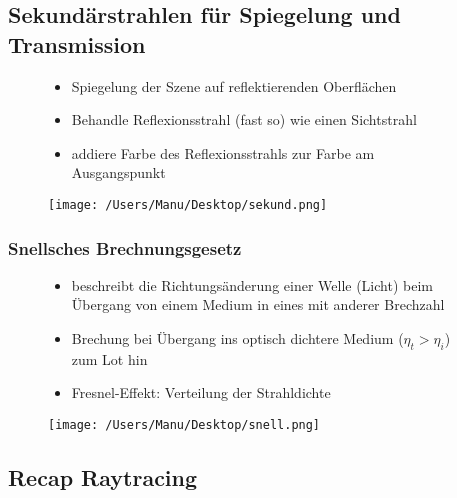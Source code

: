 \documentclass[paper=a4, fontsize=11pt]{scrartcl} %
\numberwithin{equation}{section} %
\numberwithin{figure}{section} %
\numberwithin{table}{section} %
\begin{document}
\subsection{Sekundärstrahlen für Spiegelung und Transmission}

\begin{figure}[htbp]
\begin{minipage}[t]{6cm}
\vspace{0pt}
\begin{itemize}
\item Spiegelung der Szene auf reflektierenden Oberflächen
\item Behandle Reflexionsstrahl (fast so) wie einen Sichtstrahl
\item addiere Farbe des Reflexionsstrahls zur Farbe am Ausgangspunkt
\end{itemize}
\end{minipage}
\hfill
\begin{minipage}[t]{6cm}
\vspace{0pt}
\centering
\texttt{[image: /Users/Manu/Desktop/sekund.png]}
\end{minipage}
\end{figure}

\subsubsection{Snellsches Brechnungsgesetz}

\begin{figure}[htbp]
\begin{minipage}[t]{10cm}
\vspace{0pt}
\begin{itemize}
\item beschreibt die Richtungsänderung einer Welle (Licht) beim Übergang von einem Medium in eines mit anderer Brechzahl
\item Brechung bei Übergang ins optisch dichtere Medium ($\eta_t > \eta_i$) zum Lot hin
\item Fresnel-Effekt: Verteilung der Strahldichte
\end{itemize}
\end{minipage}
\hfill
\begin{minipage}[t]{4cm}
\vspace{0pt}
\centering
\texttt{[image: /Users/Manu/Desktop/snell.png]}
\end{minipage}
\end{figure}

\subsection{Recap Raytracing}
\end{document}
